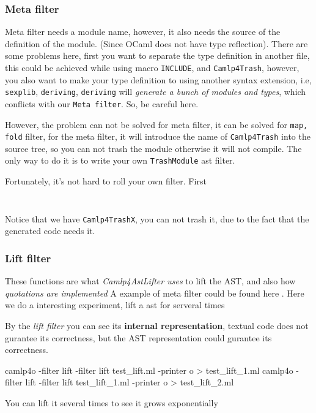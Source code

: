 \subsubsection{Meta filter}
Meta filter needs a module name, however, it also needs the source of
the definition of the module. (Since OCaml does not have type
reflection). There are some problems here, first you want to separate
the type definition in another file, this could be achieved while
using macro \verb|INCLUDE|, and \verb|Camlp4Trash|, however, you also
want to make your type definition to using another syntax extension,
i.e, \verb|sexplib|, \verb|deriving|, \verb|deriving| will
\textit{generate a bunch of modules and types}, which conflicts with
our \verb|Meta filter|. So, be careful here.


However, the problem can not be solved for meta filter, it can be
solved for \verb|map, fold| filter, for the meta filter, it will
introduce the name of \verb|Camlp4Trash| into the source tree, so you
can not trash the module otherwise it will not compile. The only way
to do it is to write your own \verb|TrashModule| ast filter.

Fortunately, it's not hard to roll your own filter.
First 
\inputminted[fontsize=\scriptsize, fontsize=\scriptsize]{ocaml}{camlp4/code/jake/json_ast.ml}
\inputminted[fontsize=\scriptsize, fontsize=\scriptsize]{ocaml}{camlp4/code/jake/pa_json_ast.ml}
Notice that we have \verb|Camlp4TrashX|, you can not trash it, due to
the fact that the generated code needs it.

\subsubsection{Lift filter}

These functions are what \emph{Camlp4AstLifter uses} to lift the AST,
and also how \emph{quotations are implemented }
A example of meta filter could be found here .
Here we do a interesting experiment, lift a ast for serveral times

By the \textit{lift filter} you can see its \textbf{internal
  representation}, textual code does not gurantee its correctness, but
the AST representation could gurantee its correctness.


\begin{bashcode}
camlp4o -filter lift -filter lift  test_lift.ml -printer o > test_lift_1.ml
camlp4o -filter lift -filter lift  test_lift_1.ml -printer o > test_lift_2.ml
\end{bashcode}
You can lift it several times to see it grows exponentially


